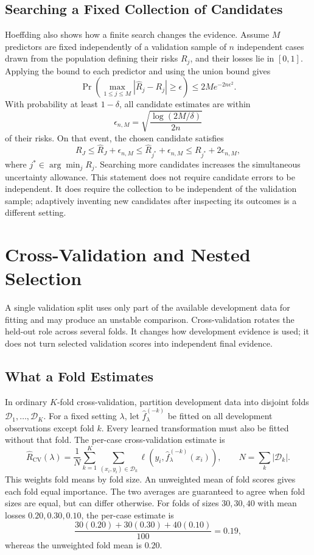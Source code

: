 \subsection{Searching a Fixed Collection of Candidates}

Hoeffding also shows how a finite search changes the evidence. Assume $M$ predictors are fixed independently of a validation sample of $n$ independent cases drawn from the population defining their risks $R_j$, and their losses lie in $[0,1]$. Applying the bound to each predictor and using the union bound gives
\[
\Pr\!\left(\max_{1\le j\le M}|\hat R_j-R_j|\ge\epsilon\right)
\le 2M e^{-2n\epsilon^2}.
\]
With probability at least $1-\delta$, all candidate estimates are within
\[
\epsilon_{n,M}=\sqrt{\frac{\log(2M/\delta)}{2n}}
\]
of their risks. On that event, the chosen candidate satisfies
\[
R_J\le\hat R_J+\epsilon_{n,M}
\le\hat R_{j^*}+\epsilon_{n,M}
\le R_{j^*}+2\epsilon_{n,M},
\]
where $j^*\in\arg\min_j R_j$. Searching more candidates increases the simultaneous uncertainty allowance. This statement does not require candidate errors to be independent. It does require the collection to be independent of the validation sample; adaptively inventing new candidates after inspecting its outcomes is a different setting.

\section{Cross-Validation and Nested Selection}

A single validation split uses only part of the available development data for fitting and may produce an unstable comparison. Cross-validation rotates the held-out role across several folds. It changes how development evidence is used; it does not turn selected validation scores into independent final evidence.

\subsection{What a Fold Estimates}

In ordinary $K$-fold cross-validation, partition development data into disjoint folds $\mathcal D_1,\ldots,\mathcal D_K$. For a fixed setting $\lambda$, let $\hat f_\lambda^{(-k)}$ be fitted on all development observations except fold $k$. Every learned transformation must also be fitted without that fold. The per-case cross-validation estimate is
\[
\hat R_{\mathrm{CV}}(\lambda)
=\frac1N\sum_{k=1}^K\sum_{(x_i,y_i)\in\mathcal D_k}
\ell(y_i,\hat f_\lambda^{(-k)}(x_i)),
\qquad N=\sum_k|\mathcal D_k|.
\]
This weights fold means by fold size. An unweighted mean of fold scores gives each fold equal importance. The two averages are guaranteed to agree when fold sizes are equal, but can differ otherwise. For folds of sizes $30,30,40$ with mean losses $0.20,0.30,0.10$, the per-case estimate is
\[
\frac{30(0.20)+30(0.30)+40(0.10)}{100}=0.19,
\]
whereas the unweighted fold mean is $0.20$.

